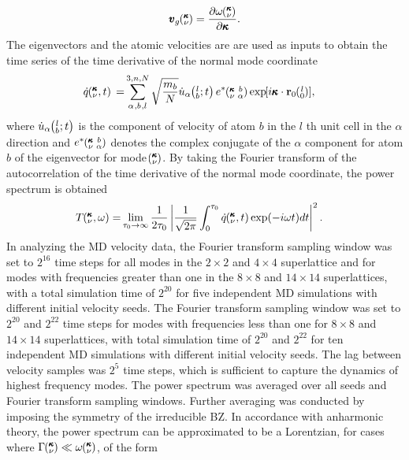 \begin{equation}\label{EQ:NMD:vg}
\begin{split}
\pmb{v}_{g}\mspace{-4.0mu}\left(\mspace{-8.0mu} \begin{smallmatrix}&\pmb{\kappa} \\&\nu\end{smallmatrix} \mspace{-3.0mu}\right)=\frac{\partial \omega \mspace{-4.0mu}\left(\mspace{-8.0mu} \begin{smallmatrix}&\pmb{\kappa} \\&\nu\end{smallmatrix} \mspace{-3.0mu}\right)}{\partial \pmb{\kappa}}.
\end{split}
\end{equation}
The eigenvectors and the atomic velocities are are used as inputs to obtain the time series of the time derivative of the normal mode coordinate 
\begin{equation}\label{EQ:NMD:qdot}
\begin{split}
\dot{q}\kvt{}{}{}=&\SUM{0}{}\sqrt{\frac{m_b}{N}}\dot{u}_{\alpha}\lbt e^*\kvba\EXP{i\pmb{\kappa}\cdot\mathbf{r}_0\ab{l}{0}},
\end{split}
\end{equation}
where $\dot{u}_{\alpha}\mspace{-4.0mu}\left(\mspace{-8.0mu} \begin{smallmatrix}&l \\&b\end{smallmatrix}\mspace{-2.0mu};t\right)$ is the component of velocity of atom $b$ in the $l$ th unit cell in the $\alpha$ direction and $e^*\mspace{-4.0mu}\left(\mspace{-8.0mu} \begin{smallmatrix} &\pmb{\kappa} &b \\ &\nu &\alpha\end{smallmatrix} \mspace{-3.0mu}\right)$ denotes the complex conjugate of the $\alpha$ component for atom $b$ of the eigenvector for mode $\mspace{-4.0mu}\left(\mspace{-8.0mu} \begin{smallmatrix}&\pmb{\kappa} \\&\nu\end{smallmatrix} \mspace{-3.0mu}\right)$. By taking the Fourier transform of the autocorrelation of the time derivative of the normal mode coordinate, the power spectrum is obtained \cite{dove_introduction_1993-3}
\begin{equation}\label{EQ:NMD:SED}
\begin{split}
T\mspace{-4.0mu}\left(\mspace{-8.0mu} \begin{smallmatrix}&\pmb{\kappa} \\&\nu\end{smallmatrix} \mspace{-2.0mu},\omega\right)=&\lim_{\tau_0\rightarrow\infty}\frac{1}{2\tau_0}\left|\frac{1}{\sqrt{2\pi}}\int_{0}^{\tau_0}\dot{q}\mspace{-4.0mu}\left(\mspace{-8.0mu} \begin{smallmatrix}&\pmb{\kappa} \\&\nu\end{smallmatrix} \mspace{-2.0mu},t\right)\exp(-i\omega t)dt\right|^2.
\end{split}
\end{equation}
In analyzing the MD velocity data, the Fourier transform sampling window was set to $2^{16}$ time steps for all modes in the $2 \times 2$ and $4 \times 4$ superlattice and for modes with frequencies greater than one in the $8\times 8$ and $14 \times 14$ superlattices, with a total simulation time of $2^{20}$ for five independent MD simulations with different initial velocity seeds. The Fourier transform sampling window was set to $2^{20}$ and $2^{22}$ time steps for modes with frequencies less than one for $8\times 8$ and $14 \times 14$ superlattices, with total simulation time of $2^{20}$ and $2^{22}$ for ten independent MD simulations with different initial velocity seeds. The lag between velocity samples was $2^5$ time steps, which is sufficient to capture the dynamics of highest frequency modes. The power spectrum was averaged over all seeds and Fourier transform sampling windows. Further averaging was conducted by imposing the symmetry of the irreducible BZ. In accordance with anharmonic theory,\cite{maradudin_scattering_1962} the power spectrum can be approximated to be a Lorentzian, for cases where $\Gamma\mspace{-4.0mu}\left(\mspace{-8.0mu} \begin{smallmatrix}&\pmb{\kappa} \\&\nu\end{smallmatrix} \mspace{-3.0mu}\right) \ll \omega\mspace{-4.0mu}\left(\mspace{-8.0mu} \begin{smallmatrix}&\pmb{\kappa} \\&\nu\end{smallmatrix} \mspace{-3.0mu}\right)$, of the form 
